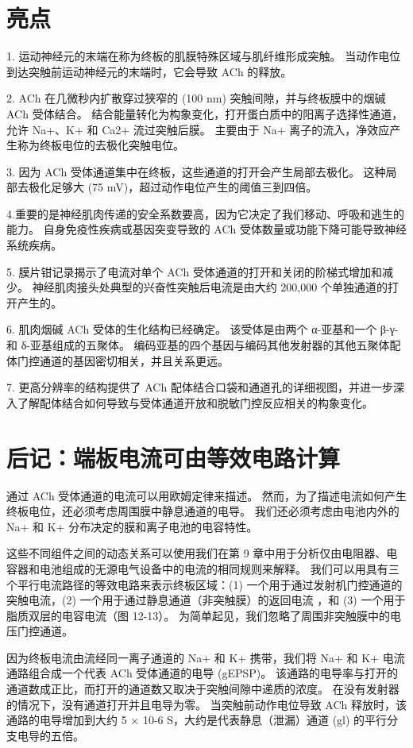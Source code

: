 \section{亮点}

1. 运动神经元的末端在称为终板的肌膜特殊区域与肌纤维形成突触。 当动作电位到达突触前运动神经元的末端时，它会导致 ACh 的释放。 

2. ACh 在几微秒内扩散穿过狭窄的 (100 nm) 突触间隙，并与终板膜中的烟碱 ACh 受体结合。 结合能量转化为构象变化，打开蛋白质中的阳离子选择性通道，允许 Na+、K+ 和 Ca2+ 流过突触后膜。 主要由于 Na+ 离子的流入，净效应产生称为终板电位的去极化突触电位。 

3. 因为 ACh 受体通道集中在终板，这些通道的打开会产生局部去极化。 这种局部去极化足够大 (75 mV)，超过动作电位产生的阈值三到四倍。 

4.重要的是神经肌肉传递的安全系数要高，因为它决定了我们移动、呼吸和逃生的能力。 自身免疫性疾病或基因突变导致的 ACh 受体数量或功能下降可能导致神经系统疾病。 

5. 膜片钳记录揭示了电流对单个 ACh 受体通道的打开和关闭的阶梯式增加和减少。 神经肌肉接头处典型的兴奋性突触后电流是由大约 200,000 个单独通道的打开产生的。 

6. 肌肉烟碱 ACh 受体的生化结构已经确定。 该受体是由两个 α-亚基和一个 β-γ-和 δ-亚基组成的五聚体。 编码亚基的四个基因与编码其他发射器的其他五聚体配体门控通道的基因密切相关，并且关系更远。 

7. 更高分辨率的结构提供了 ACh 配体结合口袋和通道孔的详细视图，并进一步深入了解配体结合如何导致与受体通道开放和脱敏门控反应相关的构象变化。

\section{后记：端板电流可由等效电路计算}

通过 ACh 受体通道的电流可以用欧姆定律来描述。 然而，为了描述电流如何产生终板电位，还必须考虑周围膜中静息通道的电导。 我们还必须考虑由电池内外的 Na+ 和 K+ 分布决定的膜和离子电池的电容特性。

这些不同组件之间的动态关系可以使用我们在第 9 章中用于分析仅由电阻器、电容器和电池组成的无源电气设备中的电流的相同规则来解释。 我们可以用具有三个平行电流路径的等效电路来表示终板区域：(1) 一个用于通过发射机门控通道的突触电流，(2) 一个用于通过静息通道（非突触膜）的返回电流 ，和 (3) 一个用于脂质双层的电容电流（图 12-13）。 为简单起见，我们忽略了周围非突触膜中的电压门控通道。

因为终板电流由流经同一离子通道的 Na+ 和 K+ 携带，我们将 Na+ 和 K+ 电流通路组合成一个代表 ACh 受体通道的电导 (gEPSP)。 该通路的电导率与打开的通道数成正比，而打开的通道数又取决于突触间隙中递质的浓度。 在没有发射器的情况下，没有通道打开并且电导为零。 当突触前动作电位导致 ACh 释放时，该通路的电导增加到大约 5 × 10-6 S，大约是代表静息（泄漏）通道 (gl) 的平行分支电导的五倍。

